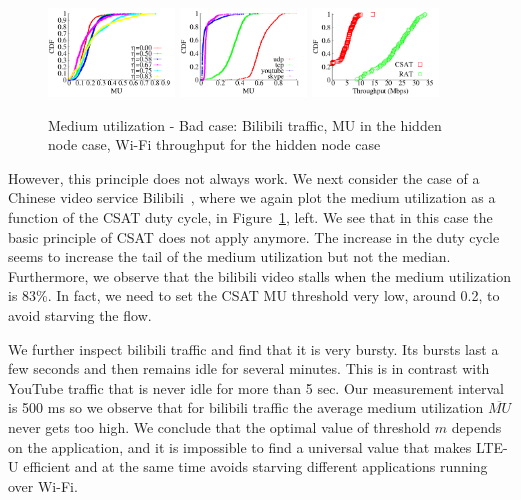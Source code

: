 \begin{figure}[htb!]
 \centering
    \includegraphics[width=0.3\textwidth]{./figures/bilibili_80211bg}
    \includegraphics[width=0.3\textwidth]{./figures/hidden_mu_applications}
    \includegraphics[width=0.3\textwidth]{./figures/hiddencase.pdf}
 \caption{Medium utilization - Bad case: Bilibili traffic, MU in the hidden node case, Wi-Fi throughput for the hidden node case}
  \label{fig:csat_mu_bad}
\vspace{-12pt}
\end{figure}

However, this principle does not always work. 
We next consider the case of a Chinese video service Bilibili~\cite{bilibili}, where we again plot the medium utilization as a function of the CSAT duty cycle, in Figure~\ref{fig:csat_mu_bad}, left. 
We see that in this case the basic principle of CSAT does not apply anymore. 
The increase in the duty cycle seems to increase the tail of the medium utilization but not the median. 
Furthermore, we observe that the bilibili video stalls when the medium utilization is 83\%.
In fact, we need to set the CSAT MU threshold very low, around 0.2, to avoid starving the flow. 

We further inspect bilibili traffic and find that it is very bursty. Its bursts last a few seconds and then remains idle for several minutes. This is in contrast with YouTube traffic that is never idle for more than 5 sec. Our measurement interval is 500 ms so we observe that for bilibili traffic the average medium utilization $\overline{MU}$ never gets too high. We conclude that the optimal value of threshold $m$ depends on the application, and it is impossible to find a universal value that makes LTE-U efficient and at the same time avoids starving different applications running over Wi-Fi.


